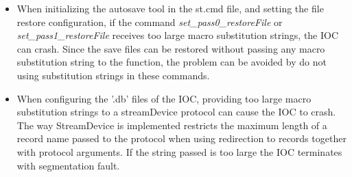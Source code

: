 \documentclass[openany]{article}
\begin{document}
		\begin{itemize}
		\item When initializing the autosave tool in the st.cmd file, and setting the file restore configuration, if the command \emph{set\_pass0\_restoreFile} or \emph{set\_pass1\_restoreFile} receives too large macro substitution strings, the IOC can crash. Since the save files can be restored without passing any macro substitution string to the function, the problem can be avoided by do not using substitution strings in these commands. 
		\end{itemize}

		\begin{itemize}
		\item When configuring the '.db' files of the IOC, providing too large macro substitution strings to a streamDevice protocol can cause the IOC to crash. The way StreamDevice is implemented restricts the maximum length of a record name passed to the protocol when using redirection to records together with protocol arguments. If the string passed is too large the IOC terminates with segmentation fault.
		\end{itemize}
\end{document}
